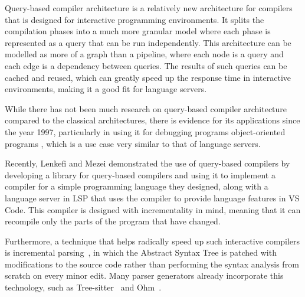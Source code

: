 Query-based compiler architecture \cite{ollef-rock} is a relatively new architecture for
compilers that is designed for interactive programming environments.
It splits the compilation phases into a much more granular model where each phase is
represented as a query that can be run independently.
This architecture can be modelled as more of a graph than a pipeline, where each node
is a query and each edge is a dependency between queries.
The results of such queries can be cached and reused, which can greatly speed up the
response time in interactive environments, making it a good fit for language servers.

While there has not been much research on query-based compiler architecture compared
to the classical architectures, there is evidence for its applications since the year 1997,
particularly in using it for debugging programs object-oriented programs \cite{Lencevicius1997},
which is a use case very similar to that of language servers.

Recently, Lenkefi and Mezei \cite{icsoft22} demonstrated the use of query-based compilers
by developing a library for query-based compilers and using it to implement a compiler
for a simple programming language they designed, along with a language server in LSP
that uses the compiler to provide language features in VS Code.
This compiler is designed with incrementality in mind, meaning that it can recompile
only the parts of the program that have changed.

Furthermore, a technique that helps radically speed up such interactive compilers
is incremental parsing~\cite{Ghezzi1979}\cite{diekmann2019editing}\cite{Wagner1998},
in which the Abstract Syntax Tree is patched with modifications to the source code
rather than performing the syntax analysis from scratch on every minor edit.
Many parser generators already incorporate this technology, such as
Tree-sitter~\cite{tree-sitter} and Ohm~\cite{Dubroy2017}.
